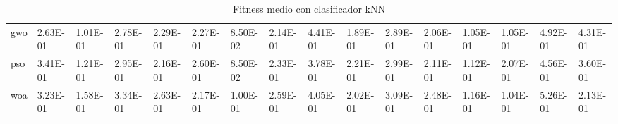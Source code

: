 \begin{table}
\begin{adjustbox}{width=\linewidth}
\begin{tabular}{llllllllllllllll}
            gwo       & 2.63E-01      & 1.01E-01    & 2.78E-01 & 2.29E-01 & 2.27E-01   & 8.50E-02 & 2.14E-01   & 4.41E-01 & 1.89E-01     & 2.89E-01     & 2.06E-01     & 1.05E-01 & 1.05E-01 & 4.92E-01 & 4.31E-01\tabularnewline
            pso       & 3.41E-01      & 1.21E-01    & 2.95E-01 & 2.16E-01 & 2.60E-01   & 8.50E-02 & 2.33E-01   & 3.78E-01 & 2.21E-01     & 2.99E-01     & 2.11E-01     & 1.12E-01 & 2.07E-01 & 4.56E-01 & 3.60E-01\tabularnewline
            woa       & 3.23E-01      & 1.58E-01    & 3.34E-01 & 2.63E-01 & 2.17E-01   & 1.00E-01 & 2.59E-01   & 4.05E-01 & 2.02E-01     & 3.09E-01     & 2.48E-01     & 1.16E-01 & 1.04E-01 & 5.26E-01 & 2.13E-01\tabularnewline
            \bottomrule
        \end{tabular}
    \end{adjustbox}
    \caption{Fitness medio con clasificador kNN}
    \label{tab:fitness_knn}
\end{table}

